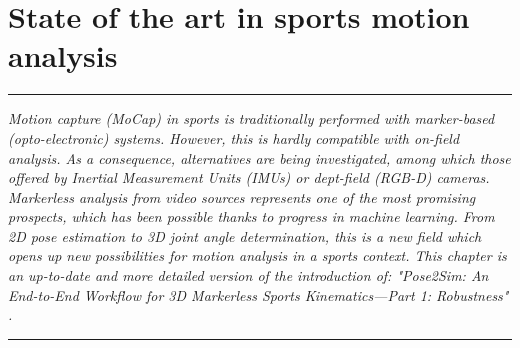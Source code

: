 
\lhead[\fancyplain{}{\leftmark}]%
      {\fancyplain{}{}} %
\chead[\fancyplain{}{}]%
      {\fancyplain{}{}}
\rhead[\fancyplain{}{}]%
      {\fancyplain{}{\rightmark}}%
\lfoot[\fancyplain{}{}]%
      {\fancyplain{}{}}
\cfoot[\fancyplain{}{\thepage}]%
      {\fancyplain{}{\thepage}} %
\rfoot[\fancyplain{}{}]%
     {\fancyplain{}{\scriptsize}}



\chapter{State of the art in sports motion analysis}
\label{ch:1}


\begin{center}
\rule{0.7\linewidth}{.5pt}
\begin{minipage}{0.7\linewidth}
\smallskip

\textit{Motion capture (MoCap) in sports is traditionally performed with marker-based (opto-electronic) systems. However, this is hardly compatible with on-field analysis. As a consequence, alternatives are being investigated, among which those offered by Inertial Measurement Units (IMUs) or dept-field (RGB-D) cameras. Markerless analysis from video sources represents one of the most promising prospects, which has been possible thanks to progress in machine learning. From 2D pose estimation to 3D joint angle determination, this is a new field which opens up new possibilities for motion analysis in a sports context.\newline \newline
This chapter is an up-to-date and more detailed version of the introduction of: "Pose2Sim: An End-to-End Workflow for 3D Markerless Sports Kinematics—Part 1: Robustness" \cite{Pagnon2021}. }

\end{minipage}
\smallskip
\rule{0.7\linewidth}{.5pt}
\end{center}


